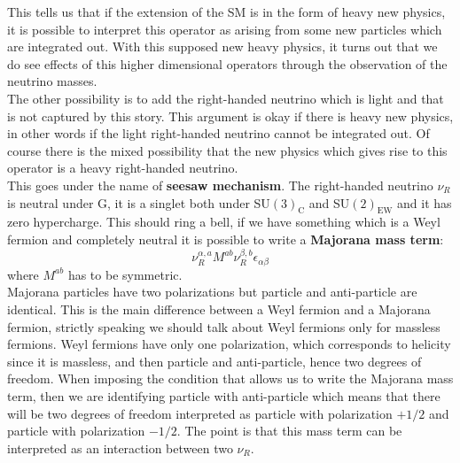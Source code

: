 \documentclass[../main.tex]{subfiles}
\begin{document}
This tells us that if the extension of the SM is in the form of heavy new physics, it is possible to interpret this operator as arising from some new particles which are integrated out. With this supposed new heavy physics, it turns out that we do see effects of this higher dimensional operators through the observation of the neutrino masses.\\
The other possibility is to add the right-handed neutrino which is light and that is not captured by this story. This argument is okay if there is heavy new physics, in other words if the light right-handed neutrino cannot be integrated out. Of course there is the mixed possibility that the new physics which gives rise to this operator is a heavy right-handed neutrino.\\
This goes under the name of \textbf{seesaw mechanism}. The right-handed neutrino $\nu_R$ is neutral under G, it is a singlet both under SU$(3)_{\text{C}}$ and SU$(2)_{\text{EW}}$ and it has zero hypercharge. This should ring a bell, if we have something which is a Weyl fermion and completely neutral it is possible to write a \textbf{Majorana mass term}:
\[
\nu_R^{\alpha,a}M^{ab}\nu_R^{\beta,b}\epsilon_{\alpha\beta}
\]
where $M^{ab}$ has to be symmetric.\\
Majorana particles have two polarizations but particle and anti-particle are identical. This is the main difference between a Weyl fermion and a Majorana fermion, strictly speaking we should talk about Weyl fermions only for massless fermions. Weyl fermions have only one polarization, which corresponds to helicity since it is massless, and then particle and anti-particle, hence two degrees of freedom. When imposing the condition that allows us to write the Majorana mass term, then we are identifying particle with anti-particle which means that there will be two degrees of freedom interpreted as particle with polarization $+1/2$ and particle with polarization $-1/2$. The point is that this mass term can be interpreted as an interaction between two $\nu_R$.
\end{document}

